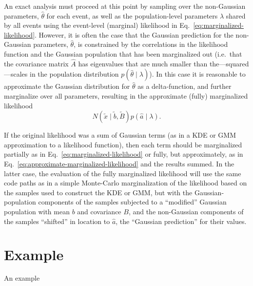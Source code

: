 \documentclass[modern]{aastex631}
\begin{document}
An exact analysis must proceed at this point by sampling over the non-Gaussian
parameters, $\hat{\theta}$ for each event, as well as the population-level
parameters $\lambda$ shared by all events using the event-level (marginal)
likelihood in Eq.\ \eqref{eq:marginalized-likelihood}.  However, it is often the
case that the Gaussian prediction for the non-Gaussian parameters,
$\hat{\theta}$, is constrained by the correlations in the likelihood function
and the Gaussian population that has been marginalized out (i.e.\ that the
covariance matrix $\hat{A}$ has eigenvalues that are much smaller than
the---squared---scales in the population distribution $p\left( \hat{\theta} \mid
\lambda \right)$).  In this case it is reasonable to approximate the Gaussian
distribution for $\hat{\theta}$ as a delta-function, and further marginalize
over all parameters, resulting in the approximate (fully) marginalized
likelihood
\begin{equation}
    \label{eq:approximate-marginalized-likelihood}
    N\left( \tilde{x} \mid \tilde{b}, \tilde{B} \right) p\left( \hat{a} \mid \lambda \right).
\end{equation}

If the original likelihood was a sum of Gaussian terms (as in a KDE or GMM
approximation to a likelihood function), then each term should be marginalized
partially as in Eq.\ \eqref{eq:marginalized-likelihood} or fully, but
approximately, as in Eq.\ \eqref{eq:approximate-marginalized-likelihood} and the
results summed.  In the latter case, the evaluation of the fully marginalized
likelihood will use the same code paths as in a simple Monte-Carlo
marginalization of the likelihood based on the samples used to construct the KDE
or GMM, but with the Gaussian-population components of the samples subjected to
a ``modified'' Gaussian population with mean $b$ and covariance $B$, and the
non-Gaussian components of the samples ``shifted'' in location to $\hat{a}$, the
``Gaussian prediction'' for their values.

\section{Example}
\label{sec:example}

An example 


\end{document}
